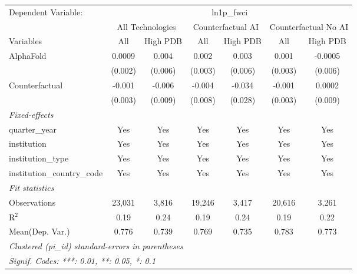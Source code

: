 \begingroup
\centering
\begin{tabular}{lcccccc}
   \tabularnewline \midrule \midrule
   Dependent Variable: & \multicolumn{6}{c}{ln1p\_fwci}\\
 & \multicolumn{2}{c}{All Technologies} & \multicolumn{2}{c}{Counterfactual AI} & \multicolumn{2}{c}{Counterfactual No AI} \\
\cmidrule(lr){1-1}\cmidrule(lr){2-3} \cmidrule(lr){4-5} \cmidrule(lr){6-7}
Variables & \multicolumn{1}{c}{All} & \multicolumn{1}{c}{High PDB} & \multicolumn{1}{c}{All} & \multicolumn{1}{c}{High PDB} & \multicolumn{1}{c}{All} & \multicolumn{1}{c}{High PDB} \\
\cmidrule(lr){1-1}\cmidrule(lr){2-2} \cmidrule(lr){3-3} \cmidrule(lr){4-4} \cmidrule(lr){5-5} \cmidrule(lr){6-6} \cmidrule(lr){7-7}
   AlphaFold                    & 0.0009  & 0.004   & 0.002   & 0.003   & 0.001   & -0.0005\\   
                                & (0.002) & (0.006) & (0.003) & (0.006) & (0.003) & (0.006)\\   
   Counterfactual               & -0.001  & -0.006  & -0.004  & -0.034  & -0.001  & 0.0002\\   
                                & (0.003) & (0.009) & (0.008) & (0.028) & (0.003) & (0.009)\\   
   \midrule
   \emph{Fixed-effects}\\
   quarter\_year                & Yes     & Yes     & Yes     & Yes     & Yes     & Yes\\  
   institution                  & Yes     & Yes     & Yes     & Yes     & Yes     & Yes\\  
   institution\_type            & Yes     & Yes     & Yes     & Yes     & Yes     & Yes\\  
   institution\_country\_code   & Yes     & Yes     & Yes     & Yes     & Yes     & Yes\\  
   \midrule
   \emph{Fit statistics}\\
   Observations                 & 23,031  & 3,816   & 19,246  & 3,417   & 20,616  & 3,261\\  
   R$^2$                        & 0.19    & 0.24    & 0.19    & 0.24    & 0.19    & 0.22\\  
Mean(Dep. Var.) & 0.776 & 0.739 & 0.769 & 0.735 & 0.783 & 0.773 \\
   \midrule \midrule
   \multicolumn{7}{l}{\emph{Clustered (pi\_id) standard-errors in parentheses}}\\
   \multicolumn{7}{l}{\emph{Signif. Codes: ***: 0.01, **: 0.05, *: 0.1}}\\
\end{tabular}
\par\endgroup
